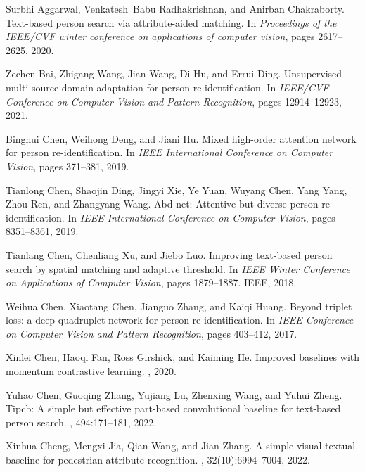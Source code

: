 \documentclass[10pt,twocolumn,letterpaper]{article}
\begin{document}
\begin{thebibliography}{10}\itemsep=-1pt

Surbhi Aggarwal, Venkatesh~Babu Radhakrishnan, and Anirban Chakraborty.
\newblock Text-based person search via attribute-aided matching.
\newblock In {\em Proceedings of the IEEE/CVF winter conference on applications
  of computer vision}, pages 2617--2625, 2020.

Zechen Bai, Zhigang Wang, Jian Wang, Di Hu, and Errui Ding.
\newblock Unsupervised multi-source domain adaptation for person
  re-identification.
\newblock In {\em IEEE/CVF Conference on Computer Vision and Pattern
  Recognition}, pages 12914--12923, 2021.

Binghui Chen, Weihong Deng, and Jiani Hu.
\newblock Mixed high-order attention network for person re-identification.
\newblock In {\em IEEE International Conference on Computer Vision}, pages
  371--381, 2019.

Tianlong Chen, Shaojin Ding, Jingyi Xie, Ye Yuan, Wuyang Chen, Yang Yang, Zhou
  Ren, and Zhangyang Wang.
\newblock Abd-net: Attentive but diverse person re-identification.
\newblock In {\em IEEE International Conference on Computer Vision}, pages
  8351--8361, 2019.

Tianlang Chen, Chenliang Xu, and Jiebo Luo.
\newblock Improving text-based person search by spatial matching and adaptive
  threshold.
\newblock In {\em IEEE Winter Conference on Applications of Computer Vision},
  pages 1879--1887. IEEE, 2018.

Weihua Chen, Xiaotang Chen, Jianguo Zhang, and Kaiqi Huang.
\newblock Beyond triplet loss: a deep quadruplet network for person
  re-identification.
\newblock In {\em IEEE Conference on Computer Vision and Pattern Recognition},
  pages 403--412, 2017.

Xinlei Chen, Haoqi Fan, Ross Girshick, and Kaiming He.
\newblock Improved baselines with momentum contrastive learning.
, 2020.

Yuhao Chen, Guoqing Zhang, Yujiang Lu, Zhenxing Wang, and Yuhui Zheng.
\newblock Tipcb: A simple but effective part-based convolutional baseline for
  text-based person search.
, 494:171--181, 2022.

Xinhua Cheng, Mengxi Jia, Qian Wang, and Jian Zhang.
\newblock A simple visual-textual baseline for pedestrian attribute
  recognition.
,
  32(10):6994--7004, 2022.


\end{thebibliography}
\end{document}
